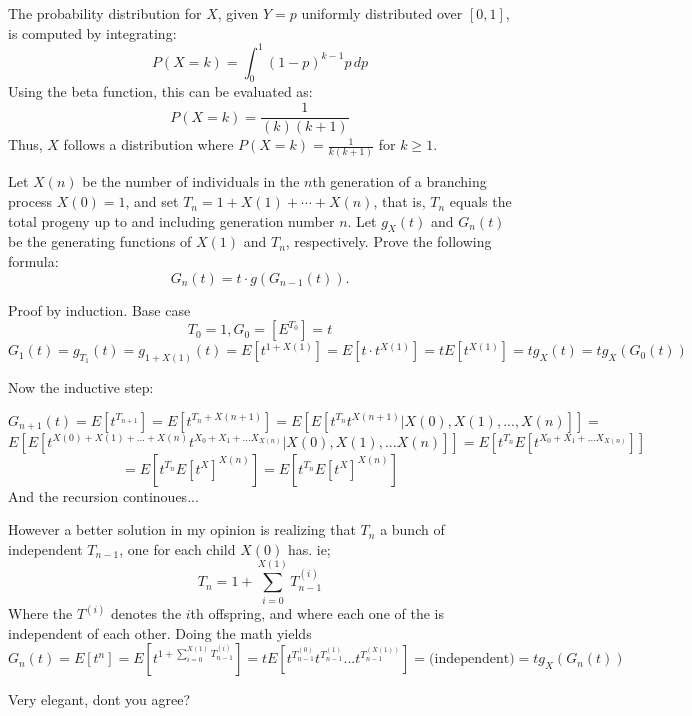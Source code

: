 \solution

The probability distribution for \( X \), given \( Y = p \) uniformly distributed over \([0,1]\), is computed by integrating:
\[ P(X = k) = \int_0^1 (1-p)^{k-1} p \, dp \]
Using the beta function, this can be evaluated as:
\[ P(X = k) = \frac{1}{(k)(k+1)} \]
Thus, \( X \) follows a distribution where \( P(X = k) = \frac{1}{k(k+1)} \) for \( k \geq 1 \).

\problem
\problem
\problem



Let \(X(n)\) be the number of individuals in the \(n\)th generation of a branching process \(X(0) = 1\), and set \(T_n = 1 + X(1) + \cdots + X(n)\), that is, \(T_n\) equals the total progeny up to and including generation number \(n\). Let \(g_X(t)\) and \(G_n(t)\) be the generating functions of \(X(1)\) and \(T_n\), respectively. Prove the following formula:
\[
G_n(t) = t \cdot g(G_{n-1}(t)).
\]
\solution

Proof by induction. Base case
\[
T_0 = 1, G_0 = [E^{T_0}] = t
\]
\[
G_1(t) = g_{T_1}(t) = g_{1 + X(1)}(t) = E[ t^{1+X(1)}] = E[ t \cdot t^{X(1)}] = t E[t^{X(1)}] = t g_X(t) = t g_X(G_0(t))
\]

Now the inductive step:

\[
  G_{n+1}(t)=E[t^{T_{n+1}}] =E[t^{T_{n} + X(n+1)}] = 
  E[E[t^{T_{n}}t^{X(n+1)}|X(0),X(1),...,X(n)]] = 
\]
\[
  E[E[t^{X(0)+X(1)+...+X(n)}t^{X_0 + X_1 + ... X_{X(n)}}|X(0),X(1),...X(n)]] = 
  E[t^{T_n}E[t^{X_0 + X_1 + ... X_{X(n)}}]] 
\]
\[
= E[t^{T_n}E[t^{X}]^{X(n)}] =  E[t^{T_n}E[t^{X}]^{X(n)}]
\]
And the recursion continoues...

However a better solution in my opinion is realizing that $T_n$ a bunch of independent $T_{n-1}$, one for each child $X(0)$ has. ie;
\[
T_n = 1 + \sum_{i=0}^{X(1)} T_{n-1}^{(i)}    
\]
Where the $T^{(i)}$ denotes the $i$th offspring, and where each one of the is independent of each other. Doing the math yields
\[
    G_{n}(t) = E[t^n] = E[t^{\textstyle 1+ \sum_{i=0}^{X(1)} T_{n-1}^{(i)}}    ]  = tE[t^{T_{n-1}^{(0)}} t^{T_{n-1}^{(1)}} ... t^{T_{n-1}^{(X(1))}} ] = \text{(independent)} = 
    t g_X(G_n(t))
\]

Very elegant, dont you agree?